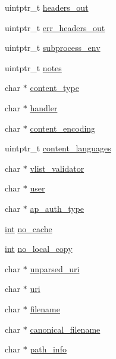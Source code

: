 \begin{DoxyCompactItemize}
uintptr\+\_\+t \hyperlink{structrequest__rec_a0fd560d8d1118304dc33df8ee99efc04}{headers\+\_\+out}
\item 
uintptr\+\_\+t \hyperlink{structrequest__rec_a691d46e2e4fcf604394aeda5cc6e21e2}{err\+\_\+headers\+\_\+out}
\item 
uintptr\+\_\+t \hyperlink{structrequest__rec_a36fa8def3b9cb16fe49d0b4d78099085}{subprocess\+\_\+env}
\item 
uintptr\+\_\+t \hyperlink{structrequest__rec_a8be66d4328766cf1da8913c9b51e0e30}{notes}
\item 
char $\ast$ \hyperlink{structrequest__rec_a539f8aba497328ed3e9c4628b0b7b4b0}{content\+\_\+type}
\item 
char $\ast$ \hyperlink{structrequest__rec_a5c5e286cfc2fd30860c1efcef7724516}{handler}
\item 
char $\ast$ \hyperlink{structrequest__rec_aa90257968ba3fbed2c21de67fdb3cf02}{content\+\_\+encoding}
\item 
uintptr\+\_\+t \hyperlink{structrequest__rec_a878515c6672309122d82260e34920946}{content\+\_\+languages}
\item 
char $\ast$ \hyperlink{structrequest__rec_a3472fa988698bd4ec9c500ea104cedff}{vlist\+\_\+validator}
\item 
char $\ast$ \hyperlink{structrequest__rec_a63f3abd83f53633f9d0069bc39aeb424}{user}
\item 
char $\ast$ \hyperlink{structrequest__rec_abda2941f76a54d63fa05d5d5b7a42a87}{ap\+\_\+auth\+\_\+type}
\item 
\hyperlink{pcre_8txt_a42dfa4ff673c82d8efe7144098fbc198}{int} \hyperlink{structrequest__rec_a9ab34a599dccdcf4f8161d0d06371a66}{no\+\_\+cache}
\item 
\hyperlink{pcre_8txt_a42dfa4ff673c82d8efe7144098fbc198}{int} \hyperlink{structrequest__rec_aa06f72f40d7318fefcc3a08ffe196c41}{no\+\_\+local\+\_\+copy}
\item 
char $\ast$ \hyperlink{structrequest__rec_a2c0077c30ea4446551ecee4e24ced868}{unparsed\+\_\+uri}
\item 
char $\ast$ \hyperlink{structrequest__rec_aee240e90eac55c732891e9408543990b}{uri}
\item 
char $\ast$ \hyperlink{structrequest__rec_a655cb2b33cbb40bd95c8da4d0da55eab}{filename}
\item 
char $\ast$ \hyperlink{structrequest__rec_af1008f929214e52e532f8eb05ac6acb2}{canonical\+\_\+filename}
\item 
char $\ast$ \hyperlink{structrequest__rec_a9d8a42a25fbd0fe2facab68e58e701db}{path\+\_\+info}

\end{DoxyCompactItemize}
